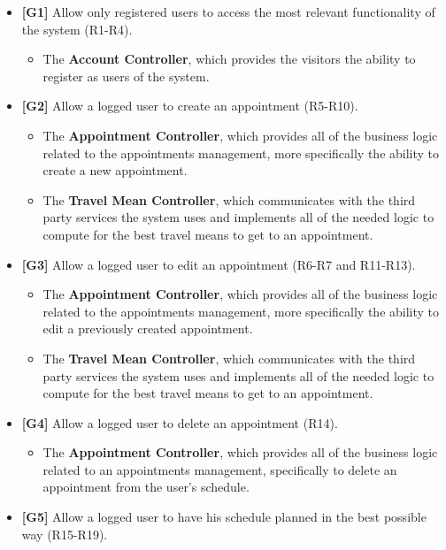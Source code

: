 \documentclass[12pt]{article}
\begin{document}
\begin{itemize}
    \item \textbf{{[G1]}} Allow only registered users to access the most relevant functionality of the system (R1-R4).
    \begin{itemize}
        \item The \textbf{Account Controller}, which provides the visitors the ability to register as users of the system.
    \end{itemize}
    \item \textbf{{[G2]}} Allow a logged user to create an appointment (R5-R10).
    \begin{itemize}
        \item The \textbf{Appointment Controller}, which provides all of the business logic related to the appointments management, more specifically the ability to create a new appointment.
        \item The \textbf{Travel Mean Controller}, which communicates with the third party services the system uses and implements all of the needed logic to compute for the best travel means to get to an appointment.
    \end{itemize}
    \item \textbf{{[G3]}} Allow a logged user to edit an appointment (R6-R7 and R11-R13).
    \begin{itemize}
        \item The \textbf{Appointment Controller}, which provides all of the business logic related to the appointments management, more specifically the ability to edit a previously created appointment.
        \item The \textbf{Travel Mean Controller}, which communicates with the third party services the system uses and implements all of the needed logic to compute for the best travel means to get to an appointment.
    \end{itemize}
    \item \textbf{{[G4]}} Allow a logged user to delete an appointment (R14).
    \begin{itemize}
        \item The \textbf{Appointment Controller}, which provides all of the business logic related to an appointments management, specifically to delete an appointment from the user's schedule.
    \end{itemize}
    \item \textbf{{[G5]}} Allow a logged user to have his schedule planned in the best possible way (R15-R19).
    \begin{itemize}

\end{itemize}
\end{itemize}
\end{document}
